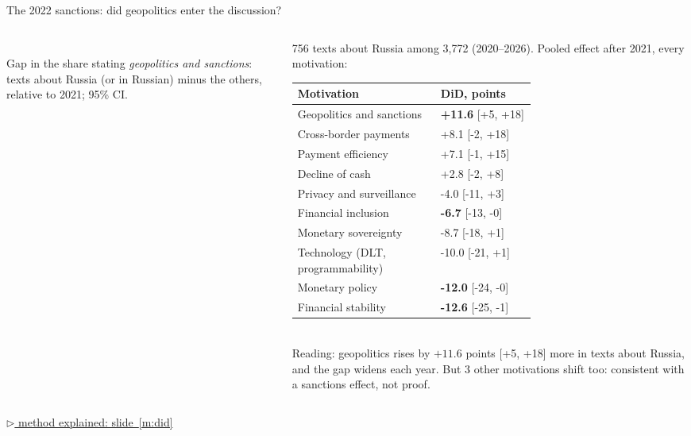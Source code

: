 \documentclass[aspectratio=169,10pt]{beamer}
\newcommand{\method}[1]{\hfill\hyperref[#1]{\tiny\textcolor{c4}{$\triangleright$ method explained: slide~\ref*{#1}}}}
\begin{document}
\begin{frame}{The 2022 sanctions: did geopolitics enter the discussion?}
\begin{columns}[T]
\begin{column}{0.5\textwidth}
\\
\scriptsize Gap in the share stating \emph{geopolitics and sanctions}: texts about Russia (or in Russian) minus the others, relative to 2021; 95\% CI.
\end{column}
\begin{column}{0.48\textwidth}\scriptsize
756 texts about Russia among 3,772 (2020--2026). Pooled effect after 2021, every motivation:\\[2pt]
\begin{tabular}{@{}p{0.6\linewidth}l@{}}\toprule
\textbf{Motivation} & \textbf{DiD, points}\\\midrule
Geopolitics and sanctions & \textbf{+11.6} \tiny[+5, +18] \\
Cross-border payments & +8.1 \tiny[-2, +18] \\
Payment efficiency & +7.1 \tiny[-1, +15] \\
Decline of cash & +2.8 \tiny[-2, +8] \\
Privacy and surveillance & -4.0 \tiny[-11, +3] \\
Financial inclusion & \textbf{-6.7} \tiny[-13, -0] \\
Monetary sovereignty & -8.7 \tiny[-18, +1] \\
Technology (DLT, programmability) & -10.0 \tiny[-21, +1] \\
Monetary policy & \textbf{-12.0} \tiny[-24, -0] \\
Financial stability & \textbf{-12.6} \tiny[-25, -1] \\
\bottomrule\end{tabular}\\[4pt]
\small \alert{Reading}: geopolitics rises by $+11.6$ points [+5, +18] more in texts about Russia, and the gap widens each year. But 3 other motivations shift too: \alert{consistent with} a sanctions effect, not proof.
\end{column}
\end{columns}
\method{m:did}
\end{frame}
\end{document}
